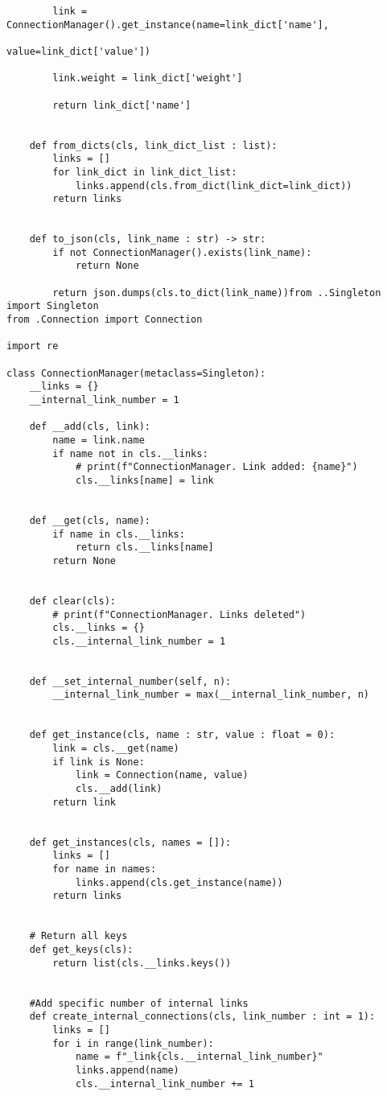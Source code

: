 {\begin{lstlisting}
        link = ConnectionManager().get_instance(name=link_dict['name'], 
                                                value=link_dict['value'])
        
        link.weight = link_dict['weight']
        
        return link_dict['name']
    
    
    def from_dicts(cls, link_dict_list : list):
        links = []
        for link_dict in link_dict_list:
            links.append(cls.from_dict(link_dict=link_dict))
        return links
    
    
    def to_json(cls, link_name : str) -> str:
        if not ConnectionManager().exists(link_name):
            return None
        
        return json.dumps(cls.to_dict(link_name))from ..Singleton import Singleton
from .Connection import Connection

import re

class ConnectionManager(metaclass=Singleton):
    __links = {}
    __internal_link_number = 1
    
    def __add(cls, link):
        name = link.name
        if name not in cls.__links:
            # print(f"ConnectionManager. Link added: {name}")
            cls.__links[name] = link
    
    
    def __get(cls, name):
        if name in cls.__links:
            return cls.__links[name]
        return None
    
    
    def clear(cls):
        # print(f"ConnectionManager. Links deleted")
        cls.__links = {}
        cls.__internal_link_number = 1
    
    
    def __set_internal_number(self, n):
        __internal_link_number = max(__internal_link_number, n)
    
    
    def get_instance(cls, name : str, value : float = 0):
        link = cls.__get(name)
        if link is None:
            link = Connection(name, value)
            cls.__add(link)
        return link
    
    
    def get_instances(cls, names = []):
        links = []
        for name in names:
            links.append(cls.get_instance(name))
        return links
    
    
    # Return all keys
    def get_keys(cls):
        return list(cls.__links.keys())
    
    
    #Add specific number of internal links
    def create_internal_connections(cls, link_number : int = 1):
        links = []
        for i in range(link_number):
            name = f"_link{cls.__internal_link_number}"
            links.append(name)
            cls.__internal_link_number += 1
        

\end{lstlisting}}
